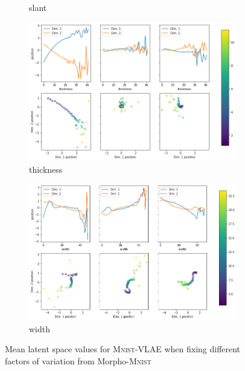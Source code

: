 \begin{figure}
\begin{subfigure}{.48\textwidth}
        \caption{slant}
        \label{subfig:vlae_mnist_morpho_latent_space_values_slant}
    \end{subfigure}
    \hfill
    \begin{subfigure}{.48\textwidth}
        \includegraphics[width=\textwidth]{images/latent_space_traversals/vlae_mnist_morpho_latent_space_values_thickness.png}
        \caption{thickness}
        \label{subfig:vlae_mnist_morpho_latent_space_values_thickness}
    \end{subfigure}
    \begin{subfigure}{.48\textwidth}
        \includegraphics[width=\textwidth]{images/latent_space_traversals/vlae_mnist_morpho_latent_space_values_width.png}
        \caption{width}
    \end{subfigure}
    \caption[\textsc{Mnist}-VLAE: Latent Space Values]{Mean latent space values for \textsc{Mnist}-VLAE when fixing different factors of variation from Morpho-\textsc{Mnist}}
    \label{fig:vlae_mnist_morpho_latent_space_values}
\end{figure}

